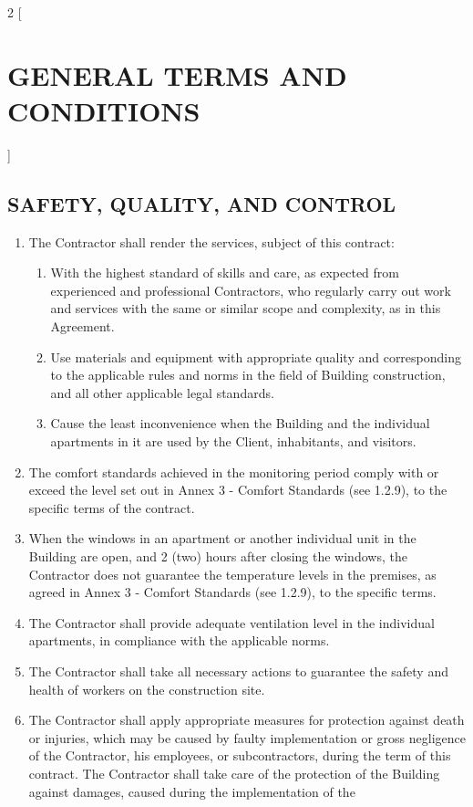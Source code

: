 \begin{multicols}{2} [\section{GENERAL TERMS AND CONDITIONS}]
  \subsection{SAFETY, QUALITY, AND CONTROL}
  \begin{enumerate}
  \item The Contractor shall render the services, subject of this
    contract:
    \begin{enumerate}
    \item With the highest standard of skills and care, as expected
      from experienced and professional Contractors, who regularly
      carry out work and services with the same or similar scope and
      complexity, as in this Agreement.
    \item Use materials and equipment with appropriate quality and
      corresponding to the applicable rules and norms in the field of
      Building construction, and all other applicable legal standards.
    \item Cause the least inconvenience when the Building and the
      individual apartments in it are used by the Client, inhabitants,
      and visitors.
    \end{enumerate}
  \item The comfort standards achieved in the monitoring period comply
    with or exceed the level set out in Annex 3 {-} Comfort Standards
    (see 1.2.9), to the specific terms of the contract.
  \item When the windows in an apartment or another individual unit in
    the Building are open, and 2 (two) hours after closing the
    windows, the Contractor does not guarantee the temperature levels
    in the premises, as agreed in Annex 3 {-} Comfort Standards (see
    1.2.9), to the specific terms.
  \item The Contractor shall provide adequate ventilation level in the
    individual apartments, in compliance with the applicable norms.
  \item The Contractor shall take all necessary actions to guarantee
    the safety and health of workers on the construction site.
  \item The Contractor shall apply appropriate measures for protection
    against death or injuries, which may be caused by faulty
    implementation or gross negligence of the Contractor, his
    employees, or subcontractors, during the term of this
    contract. The Contractor shall take care of the protection of the
    Building against damages, caused during the implementation of the

\end{enumerate}
\end{multicols}
